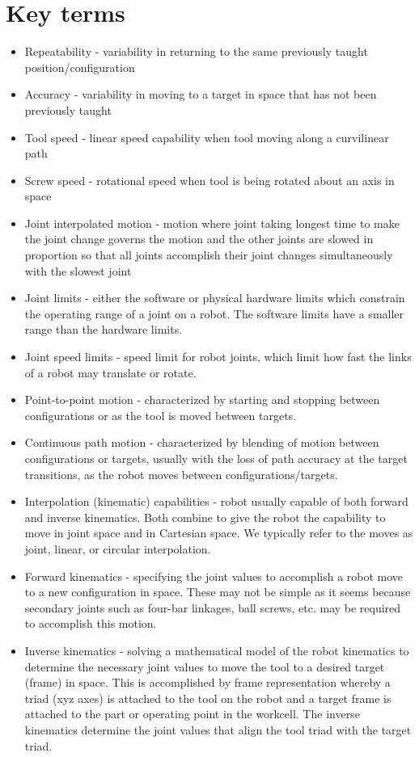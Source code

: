 \section{Key terms}
\begin{itemize}
    \item 	Repeatability - variability in returning to the same previously taught position/configuration
    \item Accuracy - variability in moving to a target in space that has not been previously taught
    \item Tool speed - linear speed capability when tool moving along a curvilinear path
    \item Screw speed - rotational speed when tool is being rotated about an axis in space
    \item Joint interpolated motion - motion where joint taking longest time to make the joint change governs the motion and the other joints are slowed in proportion so that all joints accomplish their joint changes simultaneously with the slowest joint
    \item Joint limits - either the software or physical hardware limits which constrain the operating range of a joint on a robot. The software limits have a smaller range than the hardware limits.
    \item Joint speed limits - speed limit for robot joints, which limit how fast the links of a robot may translate or rotate.
    \item Point-to-point motion - characterized by starting and stopping between configurations or as the tool is moved between targets.
    \item Continuous path motion - characterized by blending of motion between configurations or targets, usually with the loss of path accuracy at the target transitions, as the robot moves between configurations/targets.
    \item Interpolation (kinematic) capabilities - robot usually capable of both forward and inverse kinematics. Both combine to give the robot the capability to move in joint space and in  Cartesian space. We typically refer to the moves as joint, linear, or circular interpolation.
    \item Forward kinematics - specifying the joint values to accomplish a robot move to a new configuration in space. These may not be simple as it seems because secondary joints such as four-bar linkages, ball screws, etc. may be required to accomplish this motion.
    \item Inverse kinematics - solving a mathematical model of the robot kinematics to determine the necessary joint values to move the tool to a desired target (frame) in space. This is accomplished by frame representation whereby a triad (xyz axes) is attached to the tool on the robot and a target frame is attached to the part or operating point in the workcell. The inverse kinematics determine the joint values that align the tool triad with the target triad.

\end{itemize}
